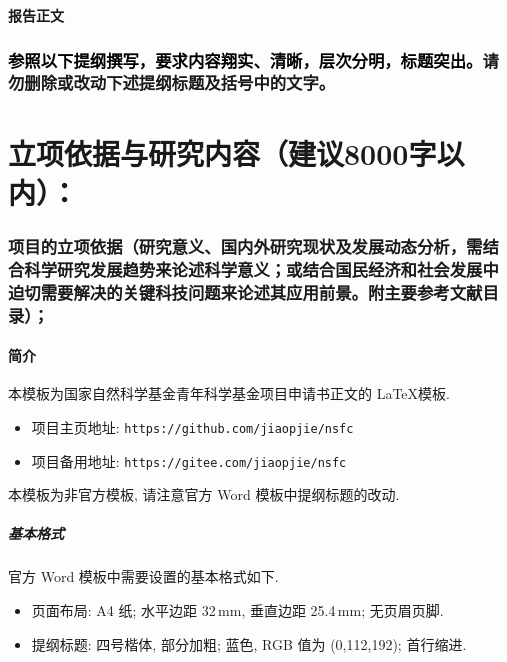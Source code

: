 \documentclass{article}
\let\kaishu\relax\newCJKfontfamily\kaishu{KaiTi}[AutoFakeBold=2.85] %
\begin{document}
\begin{center}
  \kaishu\bfseries 报告正文
\end{center}

\section*{\textcolor{black}{参照以下提纲撰写，要求内容翔实、清晰，层次分明，标题突出。}\textbf{请勿删除或改动下述提纲标题及括号中的文字。}}

\part[立项依据与研究内容]
{\textbf{立项依据与研究内容}（建议8000字以内）：}

\section[项目的立项依据]
{\textbf{项目的立项依据}（研究意义、国内外研究现状及发展动态分析，需结合科学研究发展趋势来论述科学意义；或结合国民经济和社会发展中迫切需要解决的关键科技问题来论述其应用前景。附主要参考文献目录）；}

\subsection{简介}

本模板为国家自然科学基金青年科学基金项目申请书正文的 \LaTeX 模板.
\begin{itemize}
  \item
    项目主页地址: \texttt{https://github.com/jiaopjie/nsfc}
  \item
    项目备用地址: \texttt{https://gitee.com/jiaopjie/nsfc}
\end{itemize}

本模板为非官方模板, 请注意官方 Word 模板中提纲标题的改动.

\subsubsection{基本格式}

官方 Word 模板中需要设置的基本格式如下.
\begin{itemize}
  \item \textsf{页面布局:}
    A4 纸; 水平边距 32\,mm, 垂直边距 25.4\,mm; 无页眉页脚.
  \item \textsf{提纲标题:}
    四号楷体, 部分加粗; 蓝色, RGB 值为 (0,112,192); 首行缩进.
\end{itemize}
\end{document}
